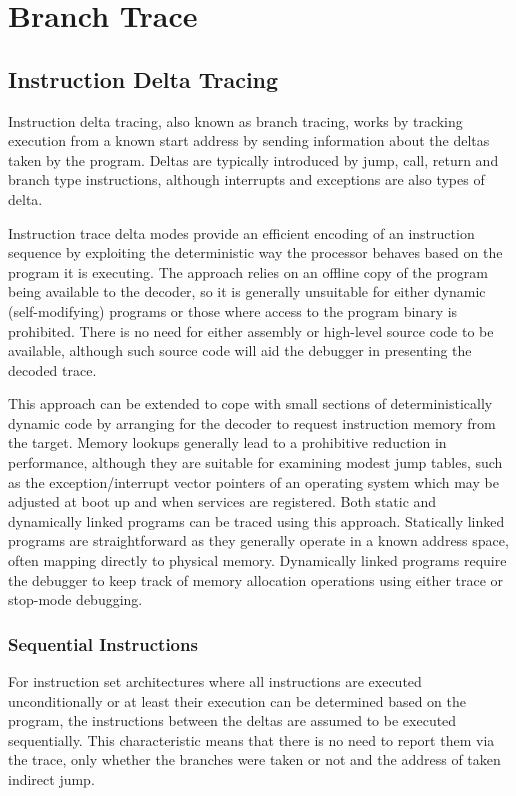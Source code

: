 \chapter{Branch Trace} \label{Branch Trace}


\section{Instruction Delta Tracing} \label{Delta Tracing}

Instruction delta tracing, also known as branch tracing, works by
tracking execution from a known start address by sending information
about the deltas taken by the program. Deltas are typically introduced
by jump, call, return and branch type instructions, although
interrupts and exceptions are also types of delta.

Instruction trace delta modes provide an efficient encoding of an
instruction sequence by exploiting the deterministic way the processor
behaves based on the program it is executing. The approach relies on
an offline copy of the program being available to the decoder, so it
is generally unsuitable for either dynamic (self-modifying) programs
or those where access to the program binary is prohibited. There is no
need for either assembly or high-level source code to be available,
although such source code will aid the debugger in presenting the
decoded trace.

This approach can be extended to cope with small sections of
deterministically dynamic code by arranging for the decoder to request
instruction memory from the target. Memory lookups generally lead to a
prohibitive reduction in performance, although they are suitable for
examining modest jump tables, such as the exception/interrupt vector
pointers of an operating system which may be adjusted at boot up and
when services are registered.  Both static and dynamically linked
programs can be traced using this approach. Statically linked programs
are straightforward as they generally operate in a known address
space, often mapping directly to physical memory. Dynamically linked
programs require the debugger to keep track of memory allocation
operations using either trace or stop-mode debugging.

\subsection{Sequential Instructions} \label{Sequential Instructions}

For instruction set architectures where all instructions are executed
unconditionally or at least their execution can be determined based on
the program, the instructions between the deltas are assumed to be
executed sequentially. This characteristic means that there is no need
to report them via the trace, only whether the branches were taken or not
and the address of taken indirect jump.

